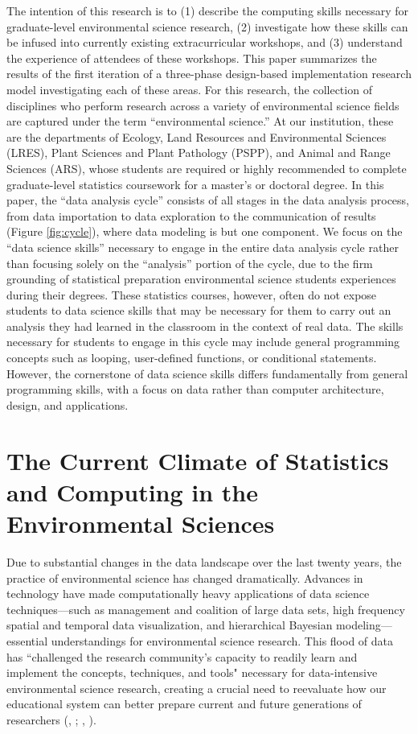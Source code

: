 \documentclass[12pt]{article}
\begin{document}
\quad The intention of this research is to (1) describe the computing skills 
necessary for graduate-level environmental science research, (2)
investigate how these skills can be infused into currently existing
extracurricular workshops, and (3) understand the experience of attendees of
these workshops. This paper summarizes the results of the first iteration of a 
three-phase design-based implementation research model investigating each of
these areas. For this research, the collection of disciplines who perform
research across a variety of environmental science fields are captured under the
term ``environmental science.'' At our institution, these are the departments of
Ecology, Land Resources and Environmental Sciences (LRES), Plant Sciences and
Plant Pathology (PSPP), and Animal and Range Sciences (ARS), whose students are
required or highly recommended to complete graduate-level statistics coursework
for a master's or doctoral degree. In this paper, the ``data analysis cycle''
consists of all stages in the data analysis process, from data importation to
data exploration to the communication of results (Figure \ref{fig:cycle}), where
data modeling is but one component. We focus on the ``data science skills'' 
necessary to engage in the entire data analysis cycle rather than focusing
solely on the ``analysis'' portion of the cycle, due to the firm grounding of 
statistical preparation environmental science students experiences during their
degrees. These statistics courses, however, often do not expose students to data
science skills that may be necessary for them to carry out an analysis they had
learned in the classroom in the context of real data. The skills necessary for
students to engage in this cycle may include general programming concepts such
as looping, user-defined functions, or conditional statements. However, the
cornerstone of data science skills differs fundamentally from general
programming skills, with a focus on data rather than computer architecture,
design, and applications. 

\section{The Current Climate of Statistics and Computing in the Environmental 
Sciences}
\label{sec:lit}

\noindent Due to substantial changes in the data landscape over the last twenty
years, the practice of environmental science has changed dramatically. Advances
in technology have made computationally heavy 
applications of data science techniques---such as management and coalition of 
large data sets, high frequency spatial and temporal data visualization, and 
hierarchical Bayesian modeling---essential understandings for environmental 
science research. This flood of data has ``challenged the research community's 
capacity to readily learn and implement the concepts, techniques, and tools" 
\citep[p.\ 546]{hampton} necessary for data-intensive environmental science 
research, creating a crucial need to reevaluate how our educational system can
better prepare current and future generations of researchers 
(\citeauthor{green}, \citeyear{green}; \citeauthor{hampton}, 
\citeyear{hampton}).  
\end{document}
